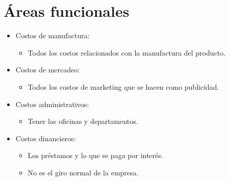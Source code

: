 \section{Áreas funcionales}
\begin{itemize}
    \item Costos de manufactura: 
        \begin{itemize}
            \item Todos los costos relacionados con la manufactura del producto.
        \end{itemize}
    
    \item Costos de mercadeo:
        \begin{itemize}
            \item Todos los costos de marketing que se hacen como publicidad.
        \end{itemize}
    
    \item Costos administrativos:
        \begin{itemize}
            \item Tener las oficinas y departamentos.
        \end{itemize}
    
    \item Costos dinancieros:
        \begin{itemize}
            \item Los préstamos y lo que se paga por interés.
            \item No es el giro normal de la empresa.
        \end{itemize}
\end{itemize}
